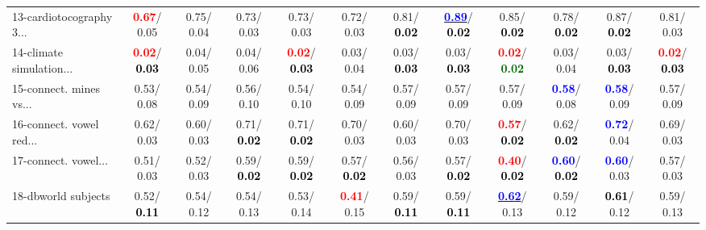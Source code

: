 \begin{table}[h]
\begin{center}
{\begin{tabular}{lc|c|c|c|c|c|c|c|c|c|c}
13-cardiotocography 3... & \textcolor{red}{\textbf{  0.67}}/  0.05 &   0.75/  0.04 &   0.73/  0.03 &   0.73/  0.03 &   0.72/  0.03 &   0.81/\textcolor{black}{\textbf{  0.02}} & \underline{\textcolor{blue}{\textbf{  0.89}}}/\textcolor{black}{\textbf{  0.02}} &   0.85/\textcolor{black}{\textbf{  0.02}} &   0.78/\textcolor{black}{\textbf{  0.02}} &   0.87/\textcolor{black}{\textbf{  0.02}} &   0.81/  0.03 \\
14-climate simulation... & \textcolor{red}{\textbf{  0.02}}/\textcolor{black}{\textbf{  0.03}} &   0.04/  0.05 &   0.04/  0.06 & \textcolor{red}{\textbf{  0.02}}/\textcolor{black}{\textbf{  0.03}} &   0.03/  0.04 &   0.03/\textcolor{black}{\textbf{  0.03}} &   0.03/\textcolor{black}{\textbf{  0.03}} & \textcolor{red}{\textbf{  0.02}}/\textcolor{darkgreen}{\textbf{  0.02}} &   0.03/  0.04 &   0.03/\textcolor{black}{\textbf{  0.03}} & \textcolor{red}{\textbf{  0.02}}/\textcolor{black}{\textbf{  0.03}} \\ \hline
15-connect. mines vs... &   0.53/  0.08 &   0.54/  0.09 &   0.56/  0.10 &   0.54/  0.10 &   0.54/  0.09 &   0.57/  0.09 &   0.57/  0.09 &   0.57/  0.09 & \textcolor{blue}{\textbf{  0.58}}/  0.08 & \textcolor{blue}{\textbf{  0.58}}/  0.09 &   0.57/  0.09 \\
16-connect. vowel red... &   0.62/  0.03 &   0.60/  0.03 &   0.71/\textcolor{black}{\textbf{  0.02}} &   0.71/\textcolor{black}{\textbf{  0.02}} &   0.70/  0.03 &   0.60/  0.03 &   0.70/  0.03 & \textcolor{red}{\textbf{  0.57}}/\textcolor{black}{\textbf{  0.02}} &   0.62/\textcolor{black}{\textbf{  0.02}} & \textcolor{blue}{\textbf{  0.72}}/  0.04 &   0.69/  0.03 \\
17-connect. vowel... &   0.51/  0.03 &   0.52/  0.03 &   0.59/\textcolor{black}{\textbf{  0.02}} &   0.59/\textcolor{black}{\textbf{  0.02}} &   0.57/\textcolor{black}{\textbf{  0.02}} &   0.56/  0.03 &   0.57/\textcolor{black}{\textbf{  0.02}} & \textcolor{red}{\textbf{  0.40}}/\textcolor{black}{\textbf{  0.02}} & \textcolor{blue}{\textbf{  0.60}}/\textcolor{black}{\textbf{  0.02}} & \textcolor{blue}{\textbf{  0.60}}/  0.03 &   0.57/  0.03 \\
18-dbworld subjects &   0.52/\textcolor{black}{\textbf{  0.11}} &   0.54/  0.12 &   0.54/  0.13 &   0.53/  0.14 & \textcolor{red}{\textbf{  0.41}}/  0.15 &   0.59/\textcolor{black}{\textbf{  0.11}} &   0.59/\textcolor{black}{\textbf{  0.11}} & \underline{\textcolor{blue}{\textbf{  0.62}}}/  0.13 &   0.59/  0.12 & \textcolor{black}{\textbf{  0.61}}/  0.12 &   0.59/  0.13 \\

\end{tabular}}
\end{center}
\end{table}
